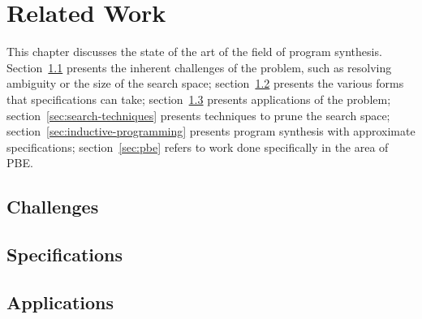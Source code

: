 
\chapter{Related Work}
\label{chapter:relatedWork}


This chapter discusses the state of the art of the field of program synthesis.
Section~\ref{sec:challenges} presents the inherent challenges of the problem,
such as resolving ambiguity or the size of the search space;
section~\ref{sec:specifications} presents the various forms
that specifications can take;
section~\ref{sec:applications} presents applications of the problem;
section~\ref{sec:search-techniques} presents techniques to prune the search
space;
section~\ref{sec:inductive-programming} presents program synthesis with
approximate specifications;
section~\ref{sec:pbe} refers to work done specifically in the area of
\ac{PBE}.

\section{Challenges}
\label{sec:challenges}

\section{Specifications}
\label{sec:specifications}


\section{Applications}
\label{sec:applications}

